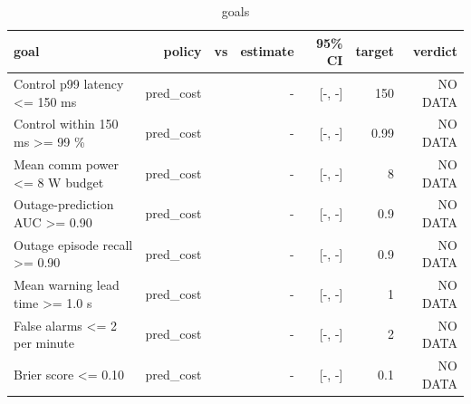 \begin{table}[t]\centering\small
\begin{tabular}{lrrrrrr}\toprule
goal & policy & vs & estimate & 95\% CI & target & verdict \\\midrule
Control p99 latency <= 150 ms & pred\_cost &  & - & [-, -] & 150 & NO DATA \\
Control within 150 ms >= 99 \% & pred\_cost &  & - & [-, -] & 0.99 & NO DATA \\
Mean comm power <= 8 W budget & pred\_cost &  & - & [-, -] & 8 & NO DATA \\
Outage-prediction AUC >= 0.90 & pred\_cost &  & - & [-, -] & 0.9 & NO DATA \\
Outage episode recall >= 0.90 & pred\_cost &  & - & [-, -] & 0.9 & NO DATA \\
Mean warning lead time >= 1.0 s & pred\_cost &  & - & [-, -] & 1 & NO DATA \\
False alarms <= 2 per minute & pred\_cost &  & - & [-, -] & 2 & NO DATA \\
Brier score <= 0.10 & pred\_cost &  & - & [-, -] & 0.1 & NO DATA \\
\bottomrule\end{tabular}\caption{goals}\end{table}
